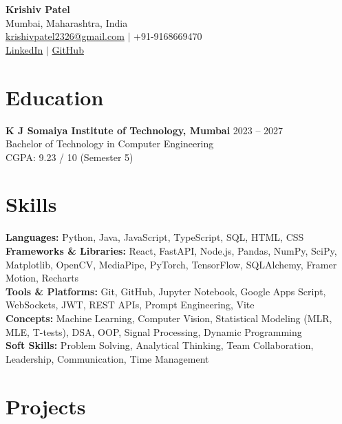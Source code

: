 \documentclass[10pt,a4paper]{article}
\begin{document}
\begin{center}
    {\LARGE \textbf{Krishiv Patel}} \\
    Mumbai, Maharashtra, India \\
    \href{mailto:krishivpatel2326@gmail.com}{krishivpatel2326@gmail.com} $|$ +91-9168669470 \\
    \href{https://www.linkedin.com/in/krishivpatel29}{LinkedIn} $|$ 
    \href{https://github.com/geekykrishiv}{GitHub}
\end{center}

\section*{Education}
\textbf{K J Somaiya Institute of Technology, Mumbai} \hfill 2023 -- 2027 \\
Bachelor of Technology in Computer Engineering \\
CGPA: 9.23 / 10 (Semester 5)

\section*{Skills}
\textbf{Languages:} Python, Java, JavaScript, TypeScript, SQL, HTML, CSS \\
\textbf{Frameworks \& Libraries:} React, FastAPI, Node.js, Pandas, NumPy, SciPy, Matplotlib, OpenCV, MediaPipe, PyTorch, TensorFlow, SQLAlchemy, Framer Motion, Recharts \\
\textbf{Tools \& Platforms:} Git, GitHub, Jupyter Notebook, Google Apps Script, WebSockets, JWT, REST APIs, Prompt Engineering, Vite \\
\textbf{Concepts:} Machine Learning, Computer Vision, Statistical Modeling (MLR, MLE, T-tests), DSA, OOP, Signal Processing, Dynamic Programming \\
\textbf{Soft Skills:} Problem Solving, Analytical Thinking, Team Collaboration, Leadership, Communication, Time Management

\section*{Projects}
\end{document}
